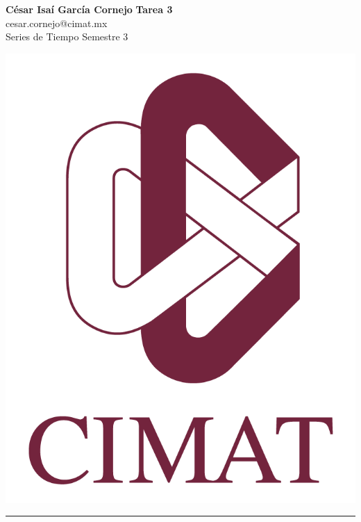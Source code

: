 \documentclass[a4paper, 11pt]{article}
\begin{document}
	\noindent
	
	\begin{minipage}[b][1.2cm][t]{0.8\textwidth}
		\large\textbf{César Isaí García Cornejo} \hfill \textbf{Tarea 3}  \\
		cesar.cornejo@cimat.mx \hfill \\
		\normalsize Series de Tiempo \hfill Semestre 3\\
	\end{minipage}
	
	\hspace{14.4cm}
	\begin{minipage}[b][0.03cm][t]{0.12\linewidth}
		
		\vspace{-2.2cm}
		\includegraphics[scale=0.3]{Figures/EscudoCimat.png}
	\end{minipage}
	
	\noindent\rule{7in}{2.8pt}
	
\end{document}
